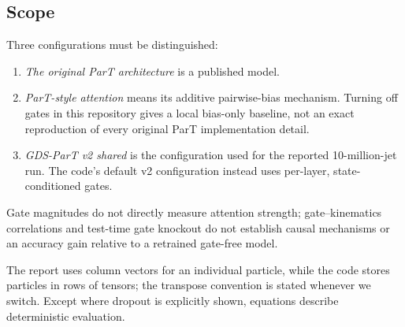 \documentclass[11pt,a4paper]{article}
\numberwithin{equation}{section}
\begin{document}
\subsection{Scope}
Three configurations must be distinguished:
\begin{enumerate}
  \item \emph{The original ParT architecture} is a published model.
  \item \emph{ParT-style attention} means its additive pairwise-bias mechanism.
    Turning off gates in this repository gives a local bias-only baseline,
    not an exact reproduction of every original ParT implementation detail.
  \item \emph{GDS-ParT v2 shared} is the configuration used for the reported
    10-million-jet run. The code's default v2 configuration instead uses
    per-layer, state-conditioned gates.
\end{enumerate}
Gate magnitudes do not directly measure attention strength; gate--kinematics
correlations and test-time gate knockout do not establish causal mechanisms
or an accuracy gain relative to a retrained gate-free model.

The report uses column vectors for an individual particle, while the code stores particles in
rows of tensors; the transpose convention is stated whenever we switch. Except where dropout is
explicitly shown, equations describe deterministic evaluation.
\end{document}

